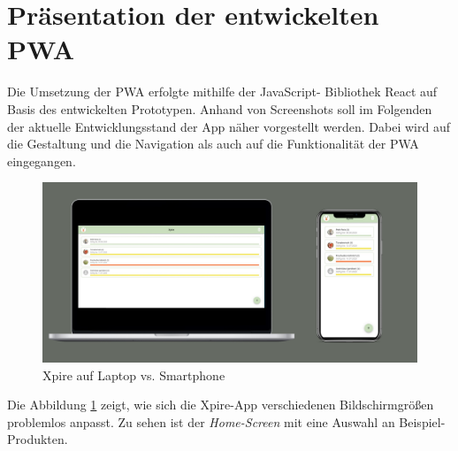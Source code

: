 \section{Präsentation der entwickelten PWA}
Die Umsetzung der PWA erfolgte mithilfe der JavaScript-
Bibliothek React auf Basis des entwickelten Prototypen. Anhand von Screenshots soll im Folgenden der aktuelle Entwicklungsstand
der App näher vorgestellt werden. Dabei wird auf die Gestaltung
und die Navigation als auch auf die Funktionalität der PWA eingegangen.

\begin{figure}[h!]
	\centering
	\includegraphics[width=1.0\textwidth]{img/app.pdf}
	\caption{Xpire auf Laptop vs. Smartphone}
	\label{fig:app}
\end{figure}

Die Abbildung \ref{fig:app} zeigt, wie sich die Xpire-App verschiedenen Bildschirmgrößen problemlos anpasst. Zu sehen ist der \textit{Home-Screen} mit eine Auswahl an Beispiel-Produkten.\\






